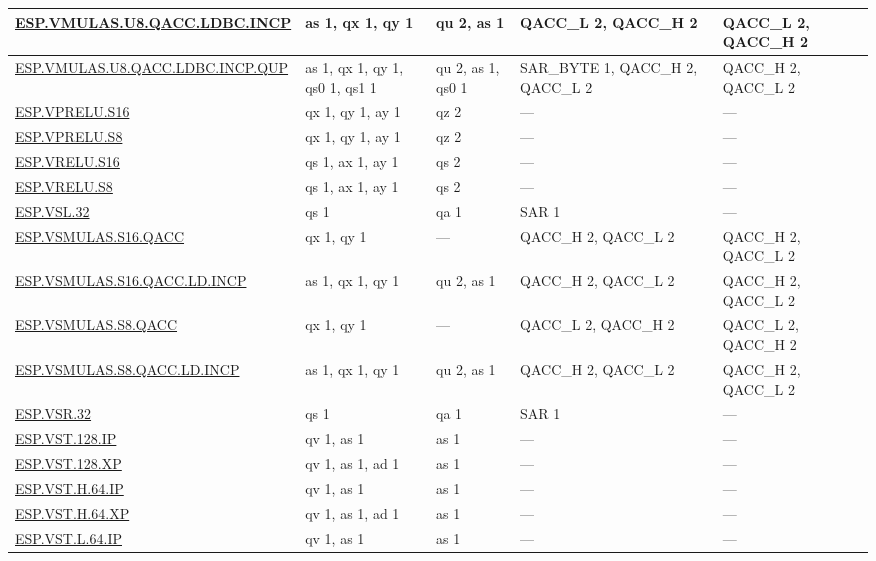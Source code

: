 \begin{longtable}[c]{|l|m{2.5cm}|m{2.5cm}|m{2.5cm}|m{2.5cm}|}
    \hyperref[instruction:ESPVMULASU8QACCLDBCINCP]{ESP.VMULAS.U8.QACC.LDBC.INCP} & as 1, qx 1, qy 1 & qu 2, as 1 & QACC\_L 2, QACC\_H 2 & QACC\_L 2, QACC\_H 2\\\hline
    \hyperref[instruction:ESPVMULASU8QACCLDBCINCPQUP]{ESP.VMULAS.U8.QACC.LDBC.INCP.QUP} & as 1, qx 1, qy 1, qs0 1, qs1 1 & qu 2, as 1, qs0 1 & SAR\_BYTE 1, QACC\_H 2, QACC\_L 2 & QACC\_H 2, QACC\_L 2\\\hline
    \hyperref[instruction:ESPVPRELUS16]{ESP.VPRELU.S16} & qx 1, qy 1, ay 1 & qz 2 & — & — \\\hline
    \hyperref[instruction:ESPVPRELUS8]{ESP.VPRELU.S8} & qx 1, qy 1, ay 1 & qz 2 & — & — \\\hline
    \hyperref[instruction:ESPVRELUS16]{ESP.VRELU.S16} & qs 1, ax 1, ay 1 & qs 2 & — & — \\\hline
    \hyperref[instruction:ESPVRELUS8]{ESP.VRELU.S8} & qs 1, ax 1, ay 1 & qs 2 & — & — \\\hline
    \hyperref[instruction:ESPVSL32]{ESP.VSL.32} & qs 1 & qa 1 & SAR 1 & — \\\hline
    \hyperref[instruction:ESPVSMULASS16QACC]{ESP.VSMULAS.S16.QACC} & qx 1, qy 1 & — & QACC\_H 2, QACC\_L 2 & QACC\_H 2, QACC\_L 2\\\hline
    \hyperref[instruction:ESPVSMULASS16QACCLDINCP]{ESP.VSMULAS.S16.QACC.LD.INCP} & as 1, qx 1, qy 1 & qu 2, as 1 & QACC\_H 2, QACC\_L 2 & QACC\_H 2, QACC\_L 2\\\hline
    \hyperref[instruction:ESPVSMULASS8QACC]{ESP.VSMULAS.S8.QACC} & qx 1, qy 1 & — & QACC\_L 2, QACC\_H 2 & QACC\_L 2, QACC\_H 2\\\hline
    \hyperref[instruction:ESPVSMULASS8QACCLDINCP]{ESP.VSMULAS.S8.QACC.LD.INCP} & as 1, qx 1, qy 1 & qu 2, as 1 & QACC\_H 2, QACC\_L 2 & QACC\_H 2, QACC\_L 2\\\hline
    \hyperref[instruction:ESPVSR32]{ESP.VSR.32} & qs 1 & qa 1 & SAR 1 & — \\\hline
    \hyperref[instruction:ESPVST128IP]{ESP.VST.128.IP} & qv 1, as 1 & as 1 & — & — \\\hline
    \hyperref[instruction:ESPVST128XP]{ESP.VST.128.XP} & qv 1, as 1, ad 1 & as 1 & — & — \\\hline
    \hyperref[instruction:ESPVSTH64IP]{ESP.VST.H.64.IP} & qv 1, as 1 & as 1 & — & — \\\hline
    \hyperref[instruction:ESPVSTH64XP]{ESP.VST.H.64.XP} & qv 1, as 1, ad 1 & as 1 & — & — \\\hline
    \hyperref[instruction:ESPVSTL64IP]{ESP.VST.L.64.IP} & qv 1, as 1 & as 1 & — & — \\\hline

\end{longtable}
